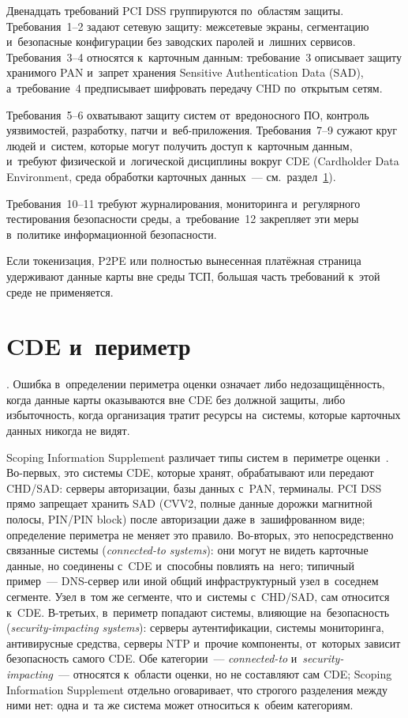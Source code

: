 Двенадцать требований PCI DSS группируются по~областям защиты. Требования~1--2
задают сетевую защиту: межсетевые экраны, сегментацию и~безопасные конфигурации
без заводских паролей и~лишних сервисов. Требования~3--4 относятся к~карточным
данным: требование~3 описывает защиту хранимого PAN и~запрет хранения Sensitive
Authentication Data (SAD), а~требование~4 предписывает шифровать передачу CHD
по~открытым сетям.

Требования~5--6 охватывают защиту систем от~вредоносного ПО, контроль
уязвимостей, разработку, патчи и~веб-приложения. Требования~7--9 сужают круг
людей и~систем, которые могут получить доступ к~карточным данным, и~требуют
физической и~логической дисциплины вокруг CDE (Cardholder Data Environment,
среда обработки карточных данных~--- см.~раздел~\ref{sec:pci-cde}).

Требования~10--11 требуют журналирования, мониторинга и~регулярного
тестирования безопасности среды, а~требование~12 закрепляет эти меры
в~политике информационной безопасности.

Если токенизация, P2PE или полностью вынесенная платёжная страница удерживают
данные карты вне среды ТСП, большая часть требований к~этой среде не применяется.

\section{CDE и~периметр}\label{sec:pci-cde}

. Ошибка в~определении периметра оценки означает либо недозащищённость,
когда данные карты оказываются вне CDE без должной защиты, либо избыточность,
когда организация тратит ресурсы на~системы, которые карточных данных никогда не
видят.

Scoping Information Supplement различает типы систем в~периметре
оценки~\cite{pci-scoping-guidance}. Во-первых, это системы CDE, которые хранят,
обрабатывают или передают CHD/SAD: серверы авторизации, базы данных с~PAN,
терминалы. PCI DSS прямо запрещает хранить SAD (CVV2, полные данные дорожки
магнитной полосы, PIN/PIN block) после авторизации даже в~зашифрованном виде;
определение периметра не меняет это правило. Во-вторых, это непосредственно
связанные системы (\textit{connected-to systems}): они могут не видеть карточные данные, но соединены
с~CDE и~способны повлиять на~него; типичный пример~--- DNS-сервер или иной
общий инфраструктурный узел в~соседнем сегменте. Узел в~том же сегменте, что
и~системы с~CHD/SAD, сам относится к~CDE. В-третьих, в~периметр попадают
системы, влияющие на~безопасность (\textit{security-impacting systems}): серверы
аутентификации, системы мониторинга, антивирусные средства, серверы NTP и~прочие
компоненты, от~которых зависит безопасность самого CDE. Обе категории~---
\textit{connected-to} и~\textit{security-impacting}~--- относятся
к~области оценки, но не составляют сам CDE; Scoping Information Supplement
отдельно оговаривает, что строгого разделения между ними нет: одна и~та же
система может относиться к~обеим категориям.

